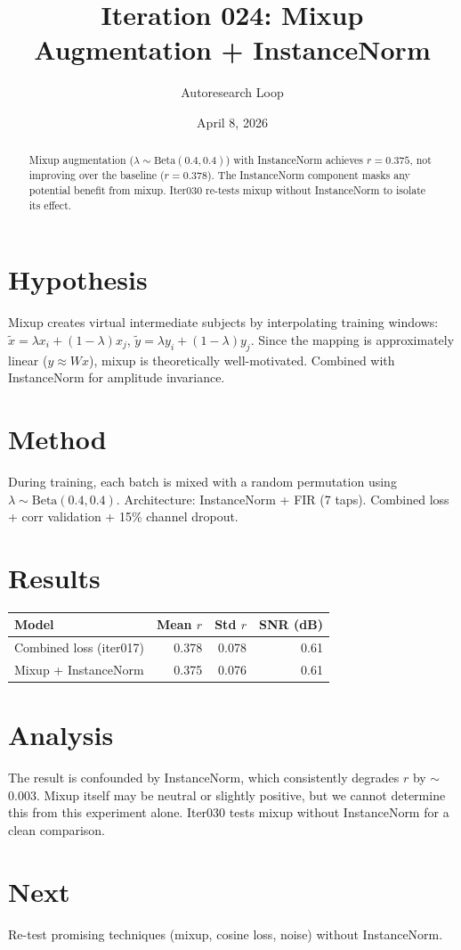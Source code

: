 \documentclass[11pt,a4paper]{article}
\title{Iteration 024: Mixup Augmentation + InstanceNorm}
\author{Autoresearch Loop}
\date{April 8, 2026}
\begin{document}
\maketitle

\begin{abstract}
Mixup augmentation ($\lambda \sim \text{Beta}(0.4, 0.4)$) with InstanceNorm
achieves $r=0.375$, not improving over the baseline ($r=0.378$). The
InstanceNorm component masks any potential benefit from mixup. Iter030
re-tests mixup without InstanceNorm to isolate its effect.
\end{abstract}

\section{Hypothesis}
Mixup creates virtual intermediate subjects by interpolating training windows:
$\tilde{x} = \lambda x_i + (1-\lambda) x_j$, $\tilde{y} = \lambda y_i + (1-\lambda) y_j$.
Since the mapping is approximately linear ($y \approx Wx$), mixup is theoretically
well-motivated. Combined with InstanceNorm for amplitude invariance.

\section{Method}
During training, each batch is mixed with a random permutation using
$\lambda \sim \text{Beta}(0.4, 0.4)$. Architecture: InstanceNorm + FIR (7 taps).
Combined loss + corr validation + 15\% channel dropout.

\section{Results}
\begin{table}[H]
\centering
\begin{tabular}{lrrr}
\toprule
Model & Mean $r$ & Std $r$ & SNR (dB) \\
\midrule
Combined loss (iter017) & 0.378 & 0.078 & 0.61 \\
Mixup + InstanceNorm & 0.375 & 0.076 & 0.61 \\
\bottomrule
\end{tabular}
\end{table}

\section{Analysis}
The result is confounded by InstanceNorm, which consistently degrades $r$
by $\sim$0.003. Mixup itself may be neutral or slightly positive, but we
cannot determine this from this experiment alone. Iter030 tests mixup
without InstanceNorm for a clean comparison.

\section{Next}
Re-test promising techniques (mixup, cosine loss, noise) without InstanceNorm.
\end{document}
